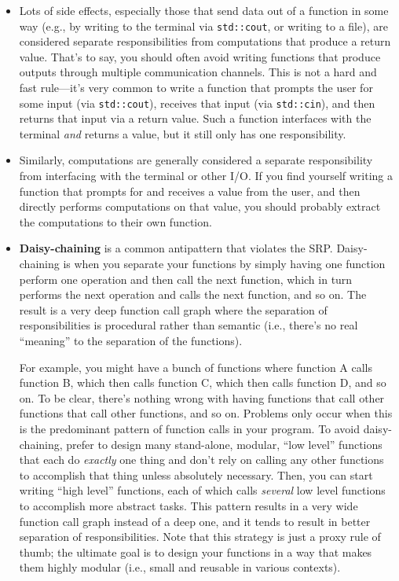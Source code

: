 \documentclass{article}
\begin{document}
\begin{itemize}
    \item Lots of side effects, especially those that send data out of a function in some way (e.g., by writing to the terminal via \texttt{std::cout}, or writing to a file), are considered separate responsibilities from computations that produce a return value. That's to say, you should often avoid writing functions that produce outputs through multiple communication channels. This is not a hard and fast rule---it's very common to write a function that prompts the user for some input (via \texttt{std::cout}), receives that input (via \texttt{std::cin}), and then returns that input via a return value. Such a function interfaces with the terminal \textit{and} returns a value, but it still only has one responsibility.
    \item Similarly, computations are generally considered a separate responsibility from interfacing with the terminal or other I/O. If you find yourself writing a function that prompts for and receives a value from the user, and then directly performs computations on that value, you should probably extract the computations to their own function.
    \item \textbf{Daisy-chaining} is a common antipattern that violates the SRP. Daisy-chaining is when you separate your functions by simply having one function perform one operation and then call the next function, which in turn performs the next operation and calls the next function, and so on. The result is a very deep function call graph where the separation of responsibilities is procedural rather than semantic (i.e., there's no real ``meaning'' to the separation of the functions).
    
    For example, you might have a bunch of functions where function A calls function B, which then calls function C, which then calls function D, and so on. To be clear, there's nothing wrong with having functions that call other functions that call other functions, and so on. Problems only occur when this is the predominant pattern of function calls in your program. To avoid daisy-chaining, prefer to design many stand-alone, modular, ``low level'' functions that each do \textit{exactly} one thing and don't rely on calling any other functions to accomplish that thing unless absolutely necessary. Then, you can start writing ``high level'' functions, each of which calls \textit{several} low level functions to accomplish more abstract tasks. This pattern results in a very wide function call graph instead of a deep one, and it tends to result in better separation of responsibilities. Note that this strategy is just a proxy rule of thumb; the ultimate goal is to design your functions in a way that makes them highly modular (i.e., small and reusable in various contexts).
\end{itemize}
\end{document}

